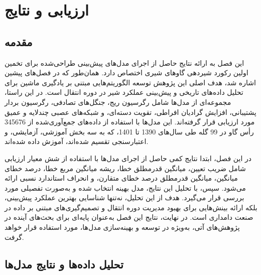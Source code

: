 \chapter{ارزیابی و نتایج}
\section{مقدمه}

این فصل به ارائه نتایج حاصل از اجرای مدل‌های پیش‌بینی طراحی‌شده برای تخمین اولین رکورد شیردهی گاوهای شیری اختصاص دارد. همان‌طور که در فصل‌های پیشین اشاره شد، هدف اصلی این پژوهش توسعه الگوریتم‌هایی مبتنی بر یادگیری ماشین برای تحلیل داده‌های تاریخی و پیش‌بینی عملکرد شیر در دوره انتقال است. در این راستا، مجموعه‌ای از مدل‌ها شامل رگرسیون ریج، جنگل‌های تصادفی، رگرسیون بردار پشتیبانی، افزایش گرادیان افراطی، تقویت دسته‌ای، و شبکه‌های عصبی چندلایه و عمیق مورد ارزیابی قرار گرفته‌اند. این مدل‌ها با استفاده از داده‌های جمع‌آوری‌شده از 345676 رأس گاو در 99 گله طی سال‌های 1390 تا 1401، که به سه بخش آموزشی، آزمایشی، و اعتبارسنجی تقسیم شده‌اند، آموزش داده شده‌اند.

در این فصل، ابتدا نتایج کمی حاصل از اجرای مدل‌ها با استفاده از شش معیار ارزیابی شامل ضریب تعیین، میانگین قدرمطلق خطا، ریشه میانگین مربع خطا، درصد خطای میانگین، میانگین قدرمطلق درصد خطای متقارن، و انحراف استاندارد نسبی ارائه می‌شود. سپس، با تحلیل این نتایج، مدل بهینه انتخاب شده و به‌صورت تفصیلی مورد بررسی قرار می‌گیرد. هدف از این تحلیل، نه‌تنها شناسایی بهترین عملکرد پیش‌بینی، بلکه ارائه بینش‌هایی برای بهبود مدیریت دوره انتقال و تصمیم‌گیری‌های مبتنی بر داده در صنعت دامداری است. در نهایت، نتایج این فصل به‌عنوان پایه‌ای برای بحث‌های آینده در پژوهش‌های آتی، به‌ویژه در توسعه و بهینه‌سازی مدل‌ها، مورد استفاده قرار خواهد گرفت.

\section{تحلیل داده‌ها و نتایج مدل‌ها}

